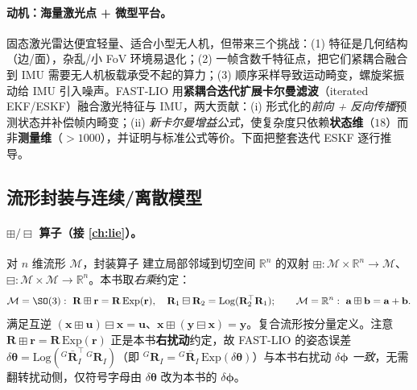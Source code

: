 \paragraph{动机：海量激光点 + 微型平台。}
固态激光雷达便宜轻量、适合小型无人机，但带来三个挑战\cite{xu2021fastlio}：(1) 特征是几何结构（边/面），杂乱/小 FoV 环境易退化；(2) 一帧含数千特征点，把它们紧耦合融合到 IMU 需要无人机板载承受不起的算力；(3) 顺序采样导致运动畸变，螺旋桨振动给 IMU 引入噪声。FAST-LIO 用\textbf{紧耦合迭代扩展卡尔曼滤波}（iterated EKF/ESKF）融合激光特征与 IMU，两大贡献：(i) 形式化的\emph{前向 + 反向传播}预测状态并补偿帧内畸变；(ii) \emph{新卡尔曼增益公式}，使复杂度只依赖\textbf{状态维}（$18$）而非\textbf{测量维}（$>1000$），并证明与标准公式等价。下面把整套迭代 ESKF 逐行推导。

\subsection{流形封装与连续/离散模型}
\label{sec:lidar-fl-model}

\paragraph{$\boxplus/\boxminus$ 算子（接 \cref{ch:lie}）。}
对 $n$ 维流形 $\mathcal{M}$，封装算子\cite{hertzberg2013integrating} 建立局部邻域到切空间 $\mathbb{R}^n$ 的双射 $\boxplus:\mathcal{M}\times\mathbb{R}^n\to\mathcal{M}$、$\boxminus:\mathcal{M}\times\mathcal{M}\to\mathbb{R}^n$。本书取\emph{右乘}约定：
\begin{equation}
  \mathcal{M}=\SO(3):\ \mathbf{R}\boxplus\mathbf{r}=\mathbf{R}\,\mathrm{Exp}(\mathbf{r}),\quad \mathbf{R}_1\boxminus\mathbf{R}_2=\mathrm{Log}(\mathbf{R}_2^\top\mathbf{R}_1);\qquad \mathcal{M}=\mathbb{R}^n:\ \mathbf{a}\boxplus\mathbf{b}=\mathbf{a}+\mathbf{b}.
  \label{eq:lidar-fl-boxplus}
\end{equation}
满足互逆 $(\mathbf{x}\boxplus\mathbf{u})\boxminus\mathbf{x}=\mathbf{u}$、$\mathbf{x}\boxplus(\mathbf{y}\boxminus\mathbf{x})=\mathbf{y}$。复合流形按分量定义。注意 $\mathbf{R}\boxplus\mathbf{r}=\mathbf{R}\,\mathrm{Exp}(\mathbf{r})$ 正是本书\textbf{右扰动}约定，故 FAST-LIO 的姿态误差 $\delta\boldsymbol{\theta}=\mathrm{Log}({}^G\bar{\mathbf{R}}_I^\top\,{}^G\mathbf{R}_I)$（即 ${}^G\mathbf{R}_I={}^G\bar{\mathbf{R}}_I\,\mathrm{Exp}(\delta\boldsymbol{\theta})$）与本书右扰动 $\delta\boldsymbol{\phi}$ \emph{一致}，无需翻转扰动侧，仅符号字母由 $\delta\boldsymbol{\theta}$ 改为本书的 $\delta\boldsymbol{\phi}$。

